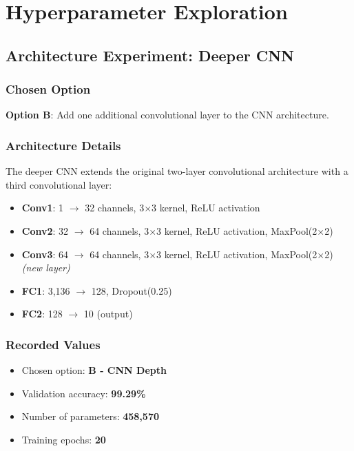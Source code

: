 \section{Hyperparameter Exploration}

\subsection{Architecture Experiment: Deeper CNN}

\subsubsection{Chosen Option}
\textbf{Option B}: Add one additional convolutional layer to the CNN architecture.

\subsubsection{Architecture Details}

The deeper CNN extends the original two-layer convolutional architecture with a third convolutional layer:

\begin{itemize}
    \item \textbf{Conv1}: 1 $\rightarrow$ 32 channels, 3$\times$3 kernel, ReLU activation
    \item \textbf{Conv2}: 32 $\rightarrow$ 64 channels, 3$\times$3 kernel, ReLU activation, MaxPool(2$\times$2)
    \item \textbf{Conv3}: 64 $\rightarrow$ 64 channels, 3$\times$3 kernel, ReLU activation, MaxPool(2$\times$2) \textit{(new layer)}
    \item \textbf{FC1}: 3,136 $\rightarrow$ 128, Dropout(0.25)
    \item \textbf{FC2}: 128 $\rightarrow$ 10 (output)
\end{itemize}

\subsubsection{Recorded Values}
\begin{itemize}
    \item Chosen option: \textbf{B - CNN Depth}
    \item Validation accuracy: \textbf{99.29\%}
    \item Number of parameters: \textbf{458,570}
    \item Training epochs: \textbf{20}
\end{itemize}


